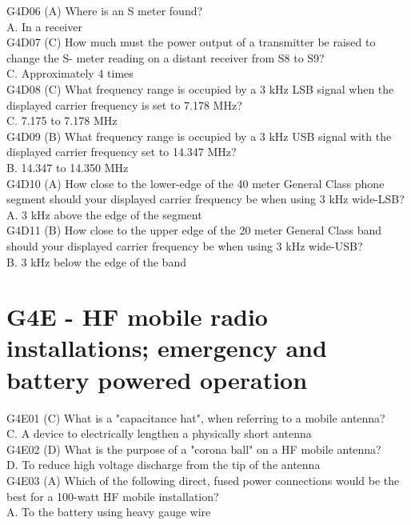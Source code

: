 \documentclass[12pt,letterpaper]{report}
\begin{document}
G4D06 (A) Where is an S meter found?\\
A. In a receiver\\

G4D07 (C) How much must the power output of a transmitter be raised to change the S- meter reading on a distant receiver from S8 to S9?\\
C. Approximately 4 times\\

G4D08 (C) What frequency range is occupied by a 3 kHz LSB signal when the displayed carrier frequency is set to 7.178 MHz? \\
C. 7.175 to 7.178 MHz\\

G4D09 (B) What frequency range is occupied by a 3 kHz USB signal with the displayed carrier frequency set to 14.347 MHz?\\
B. 14.347 to 14.350 MHz\\

G4D10 (A) How close to the lower-edge of the 40 meter General Class phone segment should your displayed carrier frequency be when using 3 kHz wide-LSB?\\
A. 3 kHz above the edge of the segment\\

G4D11 (B) How close to the upper edge of the 20 meter General Class band should your displayed carrier frequency be when using 3 kHz wide-USB? \\
B. 3 kHz below the edge of the band\\

\section{G4E - HF mobile radio installations; emergency and battery powered operation}

G4E01 (C) What is a "capacitance hat", when referring to a mobile antenna?\\
C. A device to electrically lengthen a physically short antenna\\

G4E02 (D) What is the purpose of a "corona ball" on a HF mobile antenna?\\
D. To reduce high voltage discharge from the tip of the antenna\\

G4E03 (A) Which of the following direct, fused power connections would be the best for a 100-watt HF mobile installation? \\
A. To the battery using heavy gauge wire \\
\end{document}

